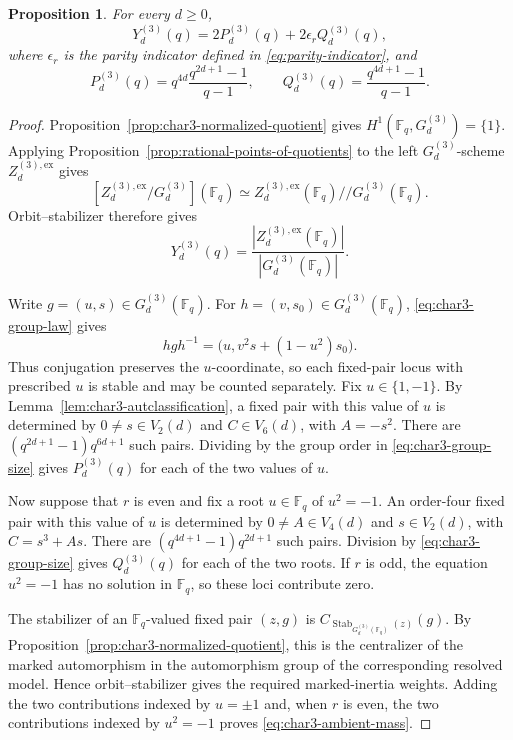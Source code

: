 \documentclass[a4paper,12pt]{amsart}
\newtheorem{prop}[thm]{Proposition}
\theoremstyle{definition}
\newcommand{\Fb}{\mathbb{F}}
\begin{document}
\begin{prop}
\label{prop:char3-ambient-mass}
For every $d\geq0$,
\begin{equation}\label{eq:char3-ambient-mass}
Y_d^{(3)}(q)
=
2P_d^{(3)}(q)+2\epsilon_rQ_d^{(3)}(q),
\end{equation}
where $\epsilon_r$ is the parity indicator defined in
\eqref{eq:parity-indicator}, and
\begin{equation}\label{eq:char3-PQ}
P_d^{(3)}(q)
=
q^{4d}\frac{q^{2d+1}-1}{q-1},
\qquad
Q_d^{(3)}(q)
=
\frac{q^{4d+1}-1}{q-1}.
\end{equation}
\end{prop}

\begin{proof}
Proposition~\ref{prop:char3-normalized-quotient} gives $H^1(\Fb_q,G_d^{(3)})=\{1\}$.  Applying Proposition~\ref{prop:rational-points-of-quotients} to the left $G_d^{(3)}$-scheme $Z_d^{(3),\mathrm{ex}}$ gives
\[
[Z_d^{(3),\mathrm{ex}}/G_d^{(3)}](\Fb_q)
\simeq
Z_d^{(3),\mathrm{ex}}(\Fb_q)\mathbin{//}G_d^{(3)}(\Fb_q).
\]
Orbit--stabilizer therefore gives
\[
Y_d^{(3)}(q)
=
\frac{|Z_d^{(3),\mathrm{ex}}(\Fb_q)|}
{|G_d^{(3)}(\Fb_q)|}.
\]

Write $g=(u,s)\in G_d^{(3)}(\Fb_q)$.  For $h=(v,s_0)\in G_d^{(3)}(\Fb_q)$, \eqref{eq:char3-group-law} gives
\[
hgh^{-1}
=
\bigl(u,v^2s+(1-u^2)s_0\bigr).
\]
Thus conjugation preserves the $u$-coordinate, so each fixed-pair locus with prescribed $u$ is stable and may be counted separately.  Fix $u\in\{1,-1\}$.  By Lemma~\ref{lem:char3-autclassification}, a fixed pair with this value of $u$ is determined by $0\neq s\in V_2(d)$ and $C\in V_6(d)$, with $A=-s^2$.  There are $(q^{2d+1}-1)q^{6d+1}$ such pairs.  Dividing by the group order in \eqref{eq:char3-group-size} gives $P_d^{(3)}(q)$ for each of the two values of $u$.

Now suppose that $r$ is even and fix a root $u\in\Fb_q$ of $u^2=-1$. An order-four fixed pair with this value of $u$ is determined by $0\neq A\in V_4(d)$ and $s\in V_2(d)$, with $C=s^3+As$.  There are $(q^{4d+1}-1)q^{2d+1}$ such pairs.  Division by \eqref{eq:char3-group-size} gives $Q_d^{(3)}(q)$ for each of the two roots.  If $r$ is odd, the equation $u^2=-1$ has no solution in $\Fb_q$, so these loci contribute zero.

The stabilizer of an $\Fb_q$-valued fixed pair $(z,g)$ is $C_{\operatorname{Stab}_{G_d^{(3)}(\Fb_q)}(z)}(g)$. By Proposition~\ref{prop:char3-normalized-quotient}, this is the centralizer of the marked automorphism in the automorphism group of the corresponding resolved model.  Hence orbit--stabilizer gives the required marked-inertia weights.  Adding the two contributions indexed by $u=\pm1$ and, when $r$ is even, the two contributions indexed by $u^2=-1$ proves \eqref{eq:char3-ambient-mass}.
\end{proof}
\end{document}
